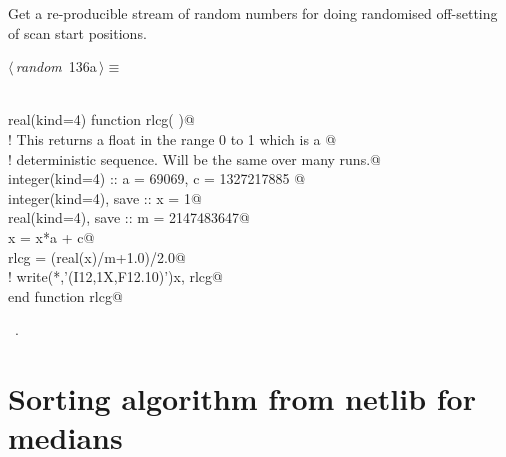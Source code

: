 \documentclass[10pt,a4paper,notitlepage]{article}
\begin{document}
Get a re-producible stream of random numbers for doing randomised
off-setting of scan start positions. 

\begin{flushleft} \small
\begin{minipage}{\linewidth}\label{scrap139}\raggedright\small
{} $\langle\,${\it random}\nobreak\ {\footnotesize {136a}}$\,\rangle\equiv$
\vspace{-1ex}
\begin{list}{}{} \item
\mbox{}\verb@@\\
\mbox{}\verb@      real(kind=4) function rlcg( )@\\
\mbox{}\verb@! This returns a float in the range 0 to 1 which is a @\\
\mbox{}\verb@! deterministic sequence. Will be the same over many runs.@\\
\mbox{}\verb@      integer(kind=4) :: a = 69069, c = 1327217885 @\\
\mbox{}\verb@      integer(kind=4), save :: x = 1@\\
\mbox{}\verb@      real(kind=4), save :: m = 2147483647@\\
\mbox{}\verb@      x = x*a + c@\\
\mbox{}\verb@      rlcg = (real(x)/m+1.0)/2.0@\\
\mbox{}\verb@!       write(*,'(I12,1X,F12.10)')x, rlcg@\\
\mbox{}\verb@      end function rlcg@\\
\mbox{}\verb@@{\NWsep}
\end{list}
\vspace{-1.5ex}
\footnotesize
\begin{list}{}{\setlength{\itemsep}{-\parsep}\setlength{\itemindent}{-\leftmargin}}
\item \NWtxtMacroRefIn\ .

\item{}
\end{list}
\end{minipage}\vspace{4ex}
\end{flushleft}
\section{Sorting algorithm from netlib for medians}
\end{document}
